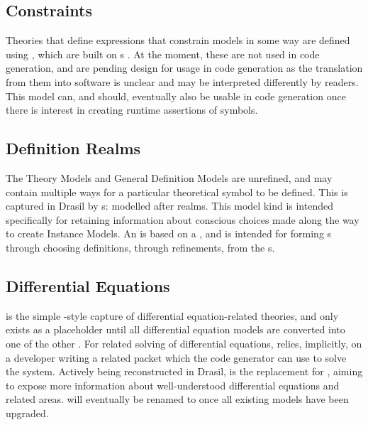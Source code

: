 
\subsection{Constraints}

Theories that define expressions that constrain models in some way are defined
using \EquationalConstraints{}, which are built on \ConstraintSet{}s . At the moment, these are not used in code generation, and are pending
design for usage in code generation as the translation from them into software
is unclear and may be interpreted differently by readers. This model can, and
should, eventually also be usable in code generation once there is interest in
creating runtime assertions of symbols.


\subsection{Definition Realms}

The Theory Models and General Definition Models are unrefined, and may contain
multiple ways for a particular theoretical symbol to be defined. This is
captured in Drasil by \EquationalRealm{}s: modelled after realms. This model kind is
intended specifically for retaining information about conscious choices made
along the way to create Instance Models. An \EquationalRealm{} is based on a
\MultiDefn{}, and is intended for forming
\QDefinition{}s through choosing definitions, through refinements, from the
\MultiDefn{}s.


\subsection{Differential Equations}

\DEModel{} is the simple \RelationConcept{}-style capture of differential
equation-related theories, and only exists as a placeholder until all
differential equation models are converted into one of the other \ModelKinds{}.
For related solving of differential equations, \DEModel{} relies, implicitly, on
a developer writing a related \ODEInfo{} packet which
the code generator can use to solve the system. Actively being reconstructed in Drasil,
\NewDEModel{} is the replacement for \DEModel{}, aiming to expose more
information about well-understood differential equations and related areas.
\NewDEModel{} will eventually be renamed to \DEModel{} once all existing
\DEModel{} models have been upgraded.

